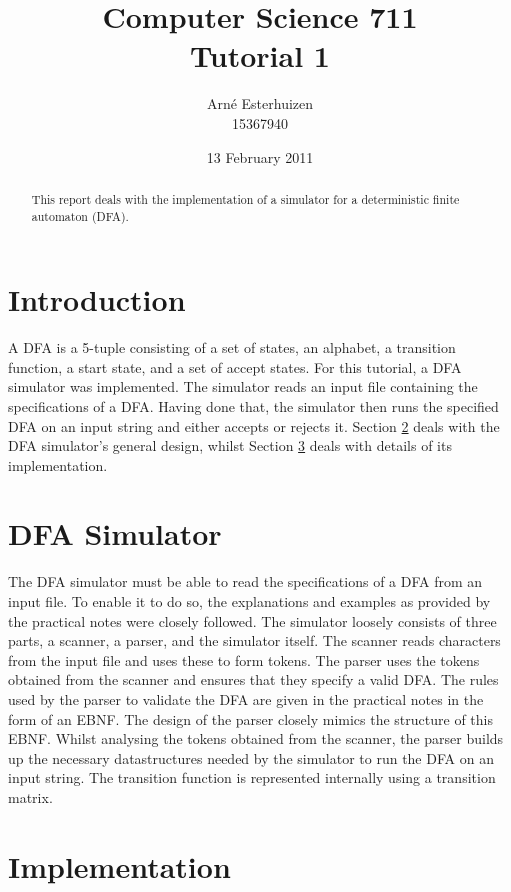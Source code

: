 \documentclass[11pt,a4paper]{article}
\begin{document}
\title{
	Computer Science 711 \\
	Tutorial 1
}
\author{
	Arn\'{e} Esterhuizen \\
	15367940
}
\date{13 February 2011}
\maketitle

\begin{abstract}
\noindent This report deals with the implementation of a simulator for a deterministic finite automaton (DFA).
\end{abstract}

\section{Introduction}
A DFA is a 5-tuple consisting of a set of states, an alphabet, a transition function, a start state, and
a set of accept states. For this tutorial, a DFA simulator was implemented. The simulator reads an input
file containing the specifications of a DFA. Having done that, the simulator then runs the specified
DFA on an input string and either accepts or rejects it. Section \ref{sec:sim} deals with the DFA simulator's
general design, whilst Section \ref{sec:imp} deals with details of its implementation.

\section{DFA Simulator}
\label{sec:sim}

The DFA simulator must be able to read the specifications of a DFA from an input file. To enable it to do so,
the explanations and examples as provided by the practical notes were closely followed. The simulator 
loosely consists of three parts, a scanner, a parser, and the simulator itself.
The scanner reads characters from the input file and uses these to form tokens. The parser uses the tokens
obtained from the scanner and ensures that they specify a valid DFA. The rules used by the parser to validate
the DFA are given in the practical notes in the form of an EBNF. The design of the parser closely mimics the structure
of this EBNF. Whilst analysing the tokens obtained from the scanner, the parser builds up the necessary datastructures
needed by the simulator to run the DFA on an input string. The transition function is represented internally using
a transition matrix.

\section{Implementation}
\label{sec:imp}
\end{document}

